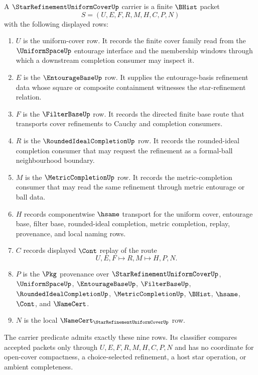 \begin{definition}
\label{def:star-refinement-uniform-cover-carrier}
A $\StarRefinementUniformCoverUp$ carrier is a finite $\BHist$ packet
$$
S=(U,E,F,R,M,H,C,P,N)
$$
with the following displayed rows:
\begin{enumerate}
\item $U$ is the uniform-cover row. It records the finite cover family read from the $\UniformSpaceUp$ entourage interface and the membership windows through which a downstream completion consumer may inspect it.
\item $E$ is the $\EntourageBaseUp$ row. It supplies the entourage-basis refinement data whose square or composite containment witnesses the star-refinement relation.
\item $F$ is the $\FilterBaseUp$ row. It records the directed finite base route that transports cover refinements to Cauchy and completion consumers.
\item $R$ is the $\RoundedIdealCompletionUp$ row. It records the rounded-ideal completion consumer that may request the refinement as a formal-ball neighbourhood boundary.
\item $M$ is the $\MetricCompletionUp$ row. It records the metric-completion consumer that may read the same refinement through metric entourage or ball data.
\item $H$ records componentwise $\hsame$ transport for the uniform cover, entourage base, filter base, rounded-ideal completion, metric completion, replay, provenance, and local naming rows.
\item $C$ records displayed $\Cont$ replay of the route
$$
U,E,F \longmapsto R,M \longmapsto H,P,N .
$$
\item $P$ is the $\Pkg$ provenance over $\StarRefinementUniformCoverUp$, $\UniformSpaceUp$, $\EntourageBaseUp$, $\FilterBaseUp$, $\RoundedIdealCompletionUp$, $\MetricCompletionUp$, $\BHist$, $\hsame$, $\Cont$, and $\NameCert$.
\item $N$ is the local $\NameCert_{\StarRefinementUniformCoverUp}$ row.
\end{enumerate}
The carrier predicate admits exactly these nine rows. Its classifier compares accepted packets only through $U,E,F,R,M,H,C,P,N$ and has no coordinate for open-cover compactness, a choice-selected refinement, a host star operation, or ambient completeness.
\end{definition}

